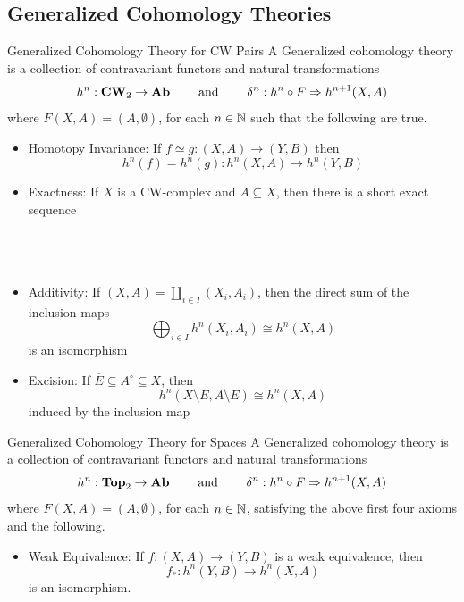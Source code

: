 \documentclass[a4paper]{article}
\begin{document}
\subsection{Generalized Cohomology Theories}
\begin{defn}{Generalized Cohomology Theory for CW Pairs}{} A Generalized cohomology theory is a collection of contravariant functors and natural transformations $$h^n:\bold{CW}_2\to\bold{Ab}\;\;\;\;\;\;\;\text{ and }\;\;\;\;\;\;\;\delta^n:h^n\circ F\Rightarrow h^{n+1}(X,A)$$ where $F(X,A)=(A,\emptyset)$, for each $n\in\mathbb{N}$ such that the following are true. 
\begin{itemize}
\item Homotopy Invariance: If $f\simeq g:(X,A)\to(Y,B)$ then $$h^n(f)=h^n(g):h^n(X,A)\to h^n(Y,B)$$
\item Exactness: If $X$ is a CW-complex and $A\subseteq X$, then there is a short exact sequence \\~\\
\\~\\
\item Additivity: If $(X,A)=\coprod_{i\in I}(X_i,A_i)$, then the direct sum of the inclusion maps $$\bigoplus_{i\in I}h^n(X_i,A_i)\cong h^n(X,A)$$ is an isomorphism
\item Excision: If $\overline{E}\subseteq A^\circ\subseteq X$, then $$h^n(X\setminus E,A\setminus E)\cong h^n(X,A)$$ induced by the inclusion map
\end{itemize}
\end{defn}

\begin{defn}{Generalized Cohomology Theory for Spaces}{} A Generalized cohomology theory is a collection of contravariant functors and natural transformations $$h^n:\bold{Top}_2\to\bold{Ab}\;\;\;\;\;\;\;\text{ and }\;\;\;\;\;\;\;\delta^n:h^n\circ F\Rightarrow h^{n+1}(X,A)$$ where $F(X,A)=(A,\emptyset)$, for each $n\in\mathbb{N}$, satisfying the above first four axioms and the following. 
\begin{itemize}
\item Weak Equivalence: If $f:(X,A)\to(Y,B)$ is a weak equivalence, then $$f_\ast:h^n(Y,B)\to h^n(X,A)$$ is an isomorphism. 
\end{itemize}
\end{defn}
\end{document}
